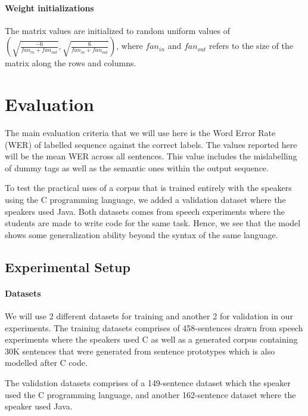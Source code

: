 \documentclass[fyp]{socreport}
\begin{document}
\subsubsection{Weight initializations} The matrix values are initialized to
random uniform values of \\$(\sqrt{\frac{-6}{fan_{in} + fan_{out}}},
\sqrt{\frac{6}{fan_{in} + fan_{out}}})$, where $fan_{in}$ and $fan_{out}$ refers
to the size of the matrix along the rows and columns.


\chapter{Evaluation}
The main evaluation criteria that we will use here is the Word Error Rate (WER)
of labelled sequence against the correct labels. The values reported here
will be the mean WER across all sentences. This value includes the mislabelling
of dummy tags as well as the semantic ones within the output sequence.

To test the practical uses of a corpus that is trained entirely with the speakers
using the C programming language, we added a validation dataset where the speakers
used Java. Both datasets comes from speech experiments where the students are
made to write code for the same task. Hence, we see that the model shows some
generalization ability beyond the syntax of the same language.



\section{Experimental Setup}
\subsubsection{Datasets}
We will use 2 different datasets for training and another 2 for validation in
our experiments. The training datasets comprises of 458-sentences drawn from
speech experiments where the speakers used C as well as a generated corpus
containing 30K sentences that were generated from sentence prototypes which is
also modelled after C code.

The validation datasets comprises of a 149-sentence dataset which the speaker
used the C programming language, and another 162-sentence dataset where the speaker
used Java.
\end{document}

